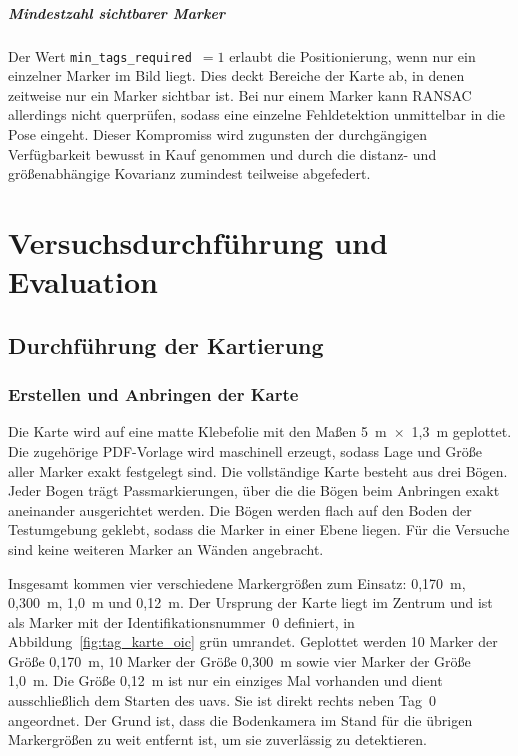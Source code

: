 \paragraph{Mindestzahl sichtbarer Marker}
Der Wert \texttt{min\_tags\_required}~$=1$ erlaubt die Positionierung, wenn nur ein einzelner Marker im Bild liegt.
Dies deckt Bereiche der Karte ab, in denen zeitweise nur ein Marker sichtbar ist.
Bei nur einem Marker kann RANSAC allerdings nicht querprüfen, sodass eine einzelne Fehldetektion unmittelbar in die Pose eingeht.
Dieser Kompromiss wird zugunsten der durchgängigen Verfügbarkeit bewusst in Kauf genommen und durch die distanz- und größenabhängige Kovarianz zumindest teilweise abgefedert.









\chapter{Versuchsdurchführung und Evaluation}
\label{cap:versuchsdurchführung}





\section{Durchführung der Kartierung}
\label{sec:durchfuehrung_kartierung}
\subsection{Erstellen und Anbringen der Karte}
\label{sec:anbringen_karte}
Die Karte wird auf eine matte Klebefolie mit den Maßen 5~m~$\times$~1,3~m geplottet.
Die zugehörige PDF-Vorlage wird maschinell erzeugt, sodass Lage und Größe aller Marker exakt festgelegt sind.
Die vollständige Karte besteht aus drei Bögen.
Jeder Bogen trägt Passmarkierungen, über die die Bögen beim Anbringen exakt aneinander ausgerichtet werden.
Die Bögen werden flach auf den Boden der Testumgebung geklebt, sodass die Marker in einer Ebene liegen.
Für die Versuche sind keine weiteren Marker an Wänden angebracht.

Insgesamt kommen vier verschiedene Markergrößen zum Einsatz: 0,170~m, 0,300~m, 1,0~m und 0,12~m.
Der Ursprung der Karte liegt im Zentrum und ist als Marker mit der Identifikationsnummer~0 definiert, in Abbildung~\ref{fig:tag_karte_oic} grün umrandet.
Geplottet werden 10 Marker der Größe 0,170~m, 10 Marker der Größe 0,300~m sowie vier Marker der Größe 1,0~m.
Die Größe 0,12~m ist nur ein einziges Mal vorhanden und dient ausschließlich dem Starten des \gls{uav}s.
Sie ist direkt rechts neben Tag~0 angeordnet.
Der Grund ist, dass die Bodenkamera im Stand für die übrigen Markergrößen zu weit entfernt ist, um sie zuverlässig zu detektieren.

